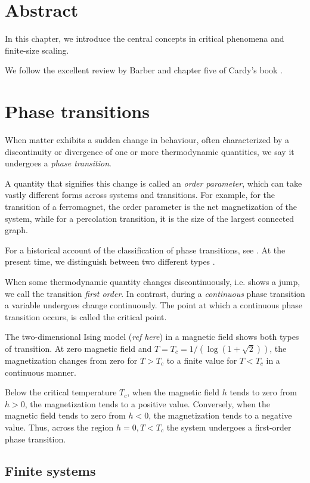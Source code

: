 \section{Abstract}

In this chapter, we introduce the central concepts in critical phenomena
and finite-size scaling.

We follow the excellent review by Barber \cite{barber1983finite} and
chapter five of Cardy's book \cite{cardy1996scaling}.

\section{Phase transitions}
When matter exhibits a sudden change in behaviour, often characterized by a discontinuity or divergence of one or more
thermodynamic quantities, we say it undergoes a \emph{phase transition}.

A quantity that signifies this change is called an \emph{order parameter},
which can take vastly different forms across systems and transitions.
For example, for the transition of a ferromagnet, the order parameter is the net magnetization of the system,
while for a percolation transition, it is the size of the largest connected graph.

For a historical account of the classification of phase transitions,
see \cite{jaeger1998ehrenfest}.
At the present time, we distinguish between two different types \cite{kadanoff2009more}.

When some thermodynamic quantity changes discontinuously, i.e.
shows a jump, we call the transition \emph{first order}.
In contrast, during a \emph{continuous} phase transition a variable undergoes change continuously.
The point at which a continuous phase transition occurs, is called the critical point.

The two-dimensional Ising model (\emph{ref here}) in a magnetic field shows both types of transition.
At zero magnetic field and $T = T_c = 1 / (\log(1 + \sqrt{2}))$, the magnetization changes from zero for $T > T_c$ to
a finite value for $T < T_c$ in a continuous manner.

Below the critical temperature $T_c$, when the magnetic field $h$ tends to zero from $h > 0$,
the magnetization tends to a positive value.
Conversely, when the magnetic field tends to zero from $h < 0$,
the magnetization tends to a negative value.
Thus, across the region $h = 0, T < T_c$ the system undergoes a first-order phase transition.

\subsection{Finite systems}

